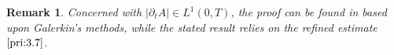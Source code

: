 \documentclass[13pt,CJK]{article}
\theoremstyle{plain}                       %
\newtheorem{remark}[lemma]{Remark}
\theoremstyle{remark}
\numberwithin{equation}{section}
\begin{document}





\begin{remark}
\emph{Concerned with $|\partial_tA|\in L^1(0,T)$, the proof can be found in
\cite[pp.127]{Sandrakov97} based upon Galerkin's methods, while
the stated result relies on the refined estimate $\eqref{pri:3.7}$.}
\end{remark}
\end{document}
